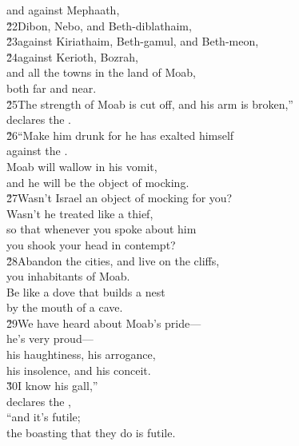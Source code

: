 \begin{poetry}
\poeml and against Mephaath, \\
\poemll    \v{22}Dibon, Nebo, and Beth-diblathaim, \\
\poeml \v{23}against Kiriathaim, Beth-gamul, and Beth-meon, \\
\poeml \v{24}against Kerioth, Bozrah, \\
\poeml and all the towns in the land of Moab, \\
\poemll    both far and near. \\
\poeml \v{25}The strength of Moab is cut off, and his arm is broken,'' \\
\poemll    declares the . \\
\poeml \v{26}``Make him drunk for he has exalted himself \\
\poemll    against the . \\
\poeml Moab will wallow in his vomit, \\
\poemll    and he will be the object of mocking. \\
\poeml \v{27}Wasn't Israel an object of mocking for you? \\
\poemll    Wasn't he treated like a thief, \\
\poeml so that whenever you spoke about him \\
\poemll    you shook your head in contempt? \\
\poeml \v{28}Abandon the cities, and live on the cliffs, \\
\poemll    you inhabitants of Moab. \\
\poeml Be like a dove that builds a nest \\
\poemll    by the mouth of a cave. \\
\poeml \v{29}We have heard about Moab's pride--- \\
\poemll    he's very proud--- \\
\poeml his haughtiness, his arrogance, \\
\poemll    his insolence, and his conceit. \\
\poeml \v{30}I know his gall,'' \\
\poemll    declares the , \\
\poeml ``and it's futile; \\
\poemll    the boasting that they do is futile. \\

\end{poetry}
